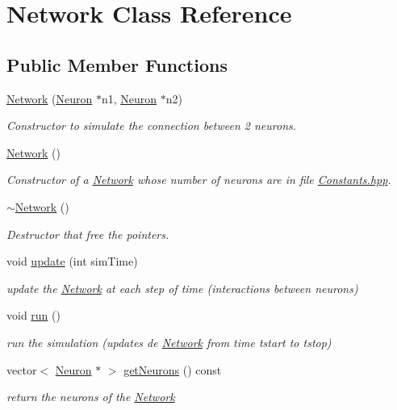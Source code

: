 \hypertarget{classNetwork}{\section{Network Class Reference}
\label{classNetwork}
}
\subsection*{Public Member Functions}
\begin{DoxyCompactItemize}
\item 
\hyperlink{classNetwork_ae9a6eb526b5fe5cd8d5ae423d430f834}{Network} (\hyperlink{classNeuron}{Neuron} $\ast$n1, \hyperlink{classNeuron}{Neuron} $\ast$n2)
\begin{DoxyCompactList}\small\item\em Constructor to simulate the connection between 2 neurons. \end{DoxyCompactList}\item 
\hyperlink{classNetwork_a3cc2fb4f8fa4d507077e8da85ce5a1c8}{Network} ()
\begin{DoxyCompactList}\small\item\em Constructor of a \hyperlink{classNetwork}{Network} whose number of neurons are in file \hyperlink{Constants_8hpp_source}{Constants.\-hpp}. \end{DoxyCompactList}\item 
\hyperlink{classNetwork_a7a4e19cdb4bf0c7ecf82baa643831492}{$\sim$\-Network} ()
\begin{DoxyCompactList}\small\item\em Destructor that free the pointers. \end{DoxyCompactList}\item 
\hypertarget{classNetwork_a295749c375dcb3c16ddbc5d5f52eba86}{void \hyperlink{classNetwork_a295749c375dcb3c16ddbc5d5f52eba86}{update} (int sim\-Time)}\label{classNetwork_a295749c375dcb3c16ddbc5d5f52eba86}

\begin{DoxyCompactList}\small\item\em update the \hyperlink{classNetwork}{Network} at each step of time (interactions between neurons) \end{DoxyCompactList}\item 
void \hyperlink{classNetwork_acc13a2e54ee332bb9f288f953ae141ed}{run} ()
\begin{DoxyCompactList}\small\item\em run the simulation (updates de \hyperlink{classNetwork}{Network} from time tstart to tstop) \end{DoxyCompactList}\item 
vector$<$ \hyperlink{classNeuron}{Neuron} $\ast$ $>$ \hyperlink{classNetwork_a8032b42ba5c9c445dcc0dd0a4916f633}{get\-Neurons} () const 
\begin{DoxyCompactList}\small\item\em return the neurons of the \hyperlink{classNetwork}{Network} \end{DoxyCompactList}\end{DoxyCompactItemize}
